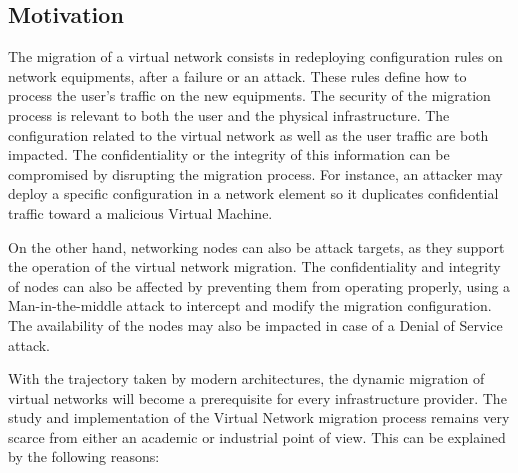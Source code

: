 \subsection{Motivation}
The migration of a virtual network consists in redeploying configuration rules on network equipments, after a failure or an attack. These rules define how to process the user's traffic on the new equipments.
The security of the migration process is relevant to both the user and the physical infrastructure.
The configuration related to the virtual network as well as the user traffic are both impacted. 
The confidentiality or the integrity of this information can be compromised by disrupting the migration process. For instance,  an attacker may deploy a specific configuration in a network element so it duplicates confidential traffic toward a malicious Virtual Machine.

On the other hand, networking nodes can also be attack targets, as they support the operation of the virtual network migration.
The confidentiality and integrity of nodes can also be affected by preventing them from operating properly, \eg using a Man-in-the-middle attack to intercept and modify the migration configuration. The availability of the nodes may also be impacted in case of a Denial of Service attack.

With the trajectory taken by modern architectures, the dynamic migration of virtual networks will become a prerequisite for every infrastructure provider.
The study and implementation of the Virtual Network migration process remains very scarce from either an academic or industrial point of view. This can be explained by the following reasons:

